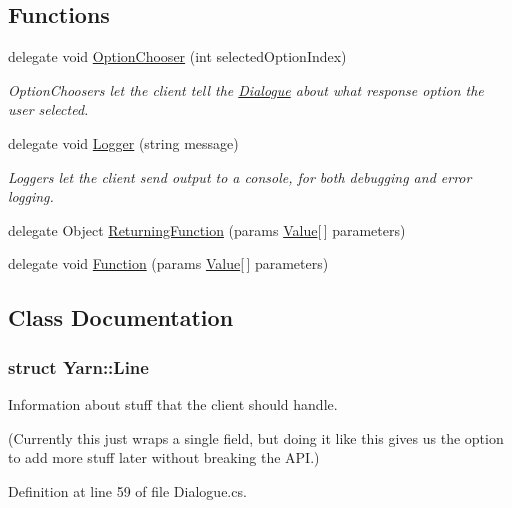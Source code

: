 \subsection*{Functions}
\begin{DoxyCompactItemize}
\item 
delegate void \hyperlink{a00051_a39866cbb03c03a35805d598b5d4ad553}{Option\-Chooser} (int selected\-Option\-Index)
\begin{DoxyCompactList}\small\item\em Option\-Choosers let the client tell the \hyperlink{a00092}{Dialogue} about what response option the user selected. \end{DoxyCompactList}\item 
delegate void \hyperlink{a00051_a1e50031b945a3a2afafee6f590730568}{Logger} (string message)
\begin{DoxyCompactList}\small\item\em Loggers let the client send output to a console, for both debugging and error logging. \end{DoxyCompactList}\item 
delegate Object \hyperlink{a00051_a5177bf74fbfe7303fac9d8236c2e514b}{Returning\-Function} (params \hyperlink{a00187}{Value}\mbox{[}$\,$\mbox{]} parameters)
\item 
delegate void \hyperlink{a00051_ae0be2e5cf13d5779816102439e61ff1a}{Function} (params \hyperlink{a00187}{Value}\mbox{[}$\,$\mbox{]} parameters)
\end{DoxyCompactItemize}


\subsection{Class Documentation}
\label{a00377}
\hypertarget{a00051_a00377}{}
\subsubsection{struct Yarn\-:\-:Line}
Information about stuff that the client should handle. 

(Currently this just wraps a single field, but doing it like this gives us the option to add more stuff later without breaking the A\-P\-I.) 

Definition at line 59 of file Dialogue.\-cs.



